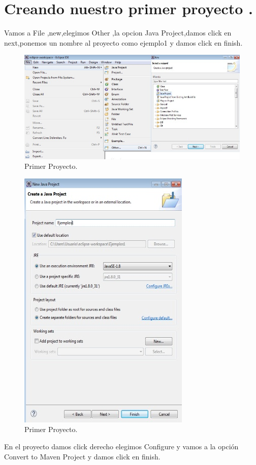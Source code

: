 \section{Creando nuestro primer proyecto .}
Vamos a File ,new,elegimos Other ,la opcion Java Project,damos click en next,ponemos un nombre al proyecto como ejemplo1 y damos click en finish.	
\begin{figure}[H] 
	\centering
	\includegraphics[scale=0.85]{images/c13_7.jpg}
	\caption{Primer Proyecto.}
\end{figure}
\begin{figure}[H] 
	\centering
	\includegraphics[scale=0.9]{images/c13_9.jpg}
	\caption{Primer Proyecto.}
\end{figure}
En el proyecto damos click derecho elegimos Configure y vamos a la opci\'on Convert to Maven Project y damos click en finish.
